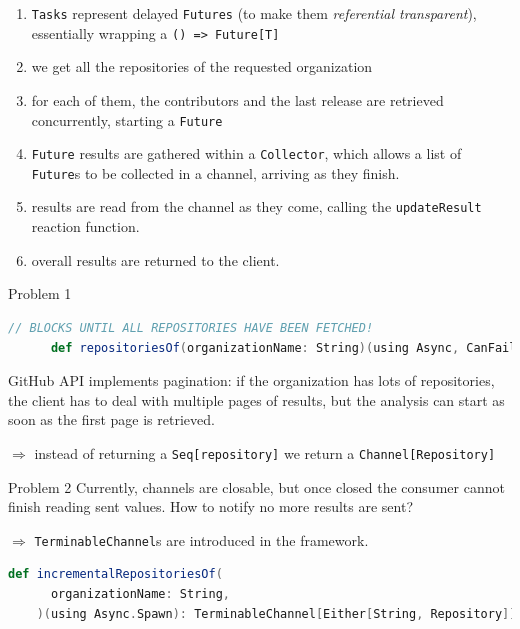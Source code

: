 \documentclass[aspectratio=1610,xcolor=dvipsnames,handout]{beamer}
\begin{document}
%
\begin{frame}
  
  \footnotesize
  \begin{enumerate}
    \item[1)] \texttt{Tasks} represent delayed \texttt{Futures} (to make them \textit{referential transparent}), essentially wrapping a \texttt{() => Future[T]}
    \item[4)] we get all the repositories of the requested organization
    \item[5)] for each of them, the contributors and the last release are retrieved concurrently, starting a \texttt{Future}
    \item[6)] \texttt{Future} results are gathered within a \texttt{Collector}, which allows a list of \texttt{Future}s to be collected in a channel, arriving as they finish.
    \item[8)] results are read from the channel as they come, calling the \texttt{updateResult} reaction function.
    \item[9)] overall results are returned to the client.
  \end{enumerate}
\end{frame}
%
\begin{frame}[fragile]
  \begin{alertblock}{Problem 1}
    \begin{lstlisting}[language=scala, gobble=6]
      // BLOCKS UNTIL ALL REPOSITORIES HAVE BEEN FETCHED!
      def repositoriesOf(organizationName: String)(using Async, CanFail): Seq[Repository]
    \end{lstlisting}
    \small
    GitHub API implements pagination: if the organization has lots of repositories, the client has to deal with multiple pages of results, but the analysis can start as soon as the first page is retrieved.
  \end{alertblock}
  \pause
  \small$\Rightarrow$ instead of returning a \texttt{Seq[repository]} we return a \texttt{Channel[Repository]}
  \pause
  \begin{alertblock}{Problem 2}
      \small
      Currently, channels are closable, but once closed the consumer cannot finish reading sent values. How to notify no more results are sent?
  \end{alertblock}
  \pause
  \small$\Rightarrow$ \texttt{TerminableChannel}s are introduced in the framework.
  \begin{lstlisting}[language=scala, gobble=4]
    def incrementalRepositoriesOf(
      organizationName: String,
    )(using Async.Spawn): TerminableChannel[Either[String, Repository]]
  \end{lstlisting}
\end{frame}
\end{document}
